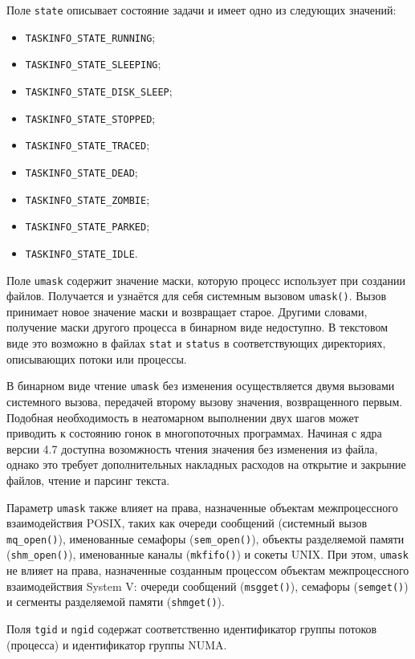 Поле \texttt{state} описывает состояние задачи и имеет одно из следующих
значений:
\begin{itemize}
\item \texttt{TASKINFO\_STATE\_RUNNING};
\item \texttt{TASKINFO\_STATE\_SLEEPING};
\item \texttt{TASKINFO\_STATE\_DISK\_SLEEP};
\item \texttt{TASKINFO\_STATE\_STOPPED};
\item \texttt{TASKINFO\_STATE\_TRACED};
\item \texttt{TASKINFO\_STATE\_DEAD};
\item \texttt{TASKINFO\_STATE\_ZOMBIE};
\item \texttt{TASKINFO\_STATE\_PARKED};
\item \texttt{TASKINFO\_STATE\_IDLE}.
\end{itemize}

Поле \texttt{umask} содержит значение маски, которую процесс использует при
создании файлов. Получается и узнаётся для себя системным вызовом
\texttt{umask()}. Вызов принимает новое значение маски и возвращает старое.
Другими словами, получение маски другого процесса в бинарном виде недоступно.
В текстовом виде это возможно в файлах \texttt{stat} и \texttt{status} в
соответствующих директориях, описывающих потоки или процессы.

В бинарном виде чтение \texttt{umask} без изменения осуществляется двумя
вызовами системного вызова, передачей второму вызову значения, возвращенного
первым. Подобная необходимость в неатомарном выполнении двух шагов может
приводить к состоянию гонок в многопоточных программах. Начиная с ядра версии
4.7 доступна возомжность чтения значения без изменения из файла, однако это
требует дополнительных накладных расходов на открытие и закрыние файлов, чтение
и парсинг текста.

Параметр \texttt{umask} также влияет на права, назначенные объектам
межпроцессного взаимодействия POSIX, таких как очереди сообщений (системный
вызов \texttt{mq\_open()}), именованные семафоры (\texttt{sem\_open()}),
объекты разделяемой памяти (\texttt{shm\_open()}), именованные каналы
(\texttt{mkfifo()}) и сокеты UNIX. При этом, \texttt{umask} не влияет на права,
назначенные созданным процессом объектам межпроцессного взаимодействия System V:
очереди сообщений (\texttt{msgget()}), семафоры (\texttt{semget()}) и сегменты
разделяемой памяти (\texttt{shmget()}).

Поля \texttt{tgid} и \texttt{ngid} содержат соответственно идентификатор группы
потоков (процесса) и идентификатор группы NUMA.

